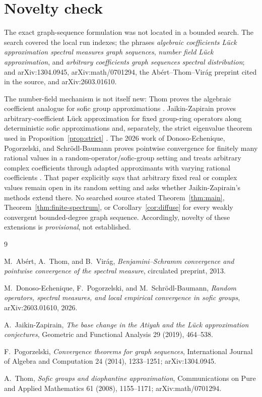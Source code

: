 \documentclass[11pt]{article}
\theoremstyle{definition}
\theoremstyle{remark}
\begin{document}
\section{Novelty check}

The exact graph-sequence formulation was not located in a bounded search.
The search covered the local run indexes; the phrases \emph{algebraic
coefficients L\"uck approximation spectral measures graph sequences},
\emph{number field L\"uck approximation}, and \emph{arbitrary coefficients
graph sequences spectral distribution}; and arXiv:1304.0945,
arXiv:math/0701294, the Ab\'ert--Thom--Vir\'ag preprint cited in the source,
and arXiv:2603.01610.

The number-field mechanism is not itself new: Thom proves the algebraic
coefficient analogue for sofic group approximations
\cite{Thom}.  Jaikin-Zapirain proves arbitrary-coefficient L\"uck
approximation for fixed group-ring operators along deterministic sofic
approximations and, separately, the strict eigenvalue theorem used in
Proposition~\ref{prop:strict} \cite{Jaikin}.  The 2026 work of
Donoso-Echenique, Pogorzelski, and Schr\"odl-Baumann proves pointwise
convergence for finitely many rational values in a random-operator/sofic-group
setting and treats arbitrary complex coefficients through adapted
approximants with varying rational coefficients \cite{DPS}.  That paper
explicitly says that arbitrary fixed real or complex values remain open in
its random setting and asks whether Jaikin-Zapirain's methods extend there.
No searched source stated Theorem~\ref{thm:main},
Theorem~\ref{thm:finite-spectrum}, or Corollary~\ref{cor:diffuse} for every
weakly convergent bounded-degree graph sequence.  Accordingly, novelty of
these extensions is \emph{provisional}, not established.

\begin{thebibliography}{9}

M.~Ab\'ert, A.~Thom, and B.~Vir\'ag,
\emph{Benjamini--Schramm convergence and pointwise convergence of the
spectral measure}, circulated preprint, 2013.

M.~Donoso-Echenique, F.~Pogorzelski, and M.~Schr\"odl-Baumann,
\emph{Random operators, spectral measures, and local empirical convergence
in sofic groups}, arXiv:2603.01610, 2026.

A.~Jaikin-Zapirain,
\emph{The base change in the Atiyah and the L\"uck approximation
conjectures}, Geometric and Functional Analysis 29 (2019), 464--538.

F.~Pogorzelski,
\emph{Convergence theorems for graph sequences},
International Journal of Algebra and Computation 24 (2014), 1233--1251;
arXiv:1304.0945.

A.~Thom,
\emph{Sofic groups and diophantine approximation},
Communications on Pure and Applied Mathematics 61 (2008), 1155--1171;
arXiv:math/0701294.

\end{thebibliography}
\end{document}
